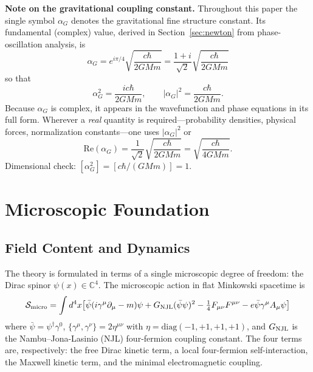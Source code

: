 \documentclass[11pt,a4paper]{article}
\theoremstyle{definition}
\theoremstyle{remark}
\begin{document}
	\bigskip
	\noindent\textbf{Note on the gravitational coupling constant.}
	Throughout this paper the single symbol $\alpha_G$ denotes the gravitational fine structure constant.  Its fundamental (complex) value, derived in Section~\ref{sec:newton} from phase-oscillation analysis, is
	\begin{equation}
		\boxed{\alpha_G = e^{i\pi/4}\sqrt{\frac{c\hbar}{2GMm}} = \frac{1+i}{\sqrt{2}}\sqrt{\frac{c\hbar}{2GMm}}}
		\label{eq:alphaG_def}
	\end{equation}
	so that
	\begin{equation}
		\alpha_G^2 = \frac{ic\hbar}{2GMm}, \qquad |\alpha_G|^2 = \frac{c\hbar}{2GMm}.
		\label{eq:alphaG_props}
	\end{equation}
	Because $\alpha_G$ is complex, it appears in the wavefunction and phase equations in its full form.  Wherever a \emph{real} quantity is required---probability densities, physical forces, normalization constants---one uses $|\alpha_G|^2$ or
	\begin{equation}
		\mathrm{Re}(\alpha_G) = \frac{1}{\sqrt{2}}\sqrt{\frac{c\hbar}{2GMm}} = \sqrt{\frac{c\hbar}{4GMm}}.
		\label{eq:alphaG_real}
	\end{equation}
	Dimensional check: $[\alpha_G^2] = [c\hbar/(GMm)] = 1$.~\checkmark
	
	\section{Microscopic Foundation}
	
	\subsection{Field Content and Dynamics}

	The theory is formulated in terms of a single microscopic degree of freedom: the Dirac spinor $\psi(x)\in\mathbb{C}^4$.  The microscopic action in flat Minkowski spacetime is
	\begin{equation}
	  \mathcal{S}_{\rm micro} = \int d^4x\!\left[
	    \bar{\psi}(i\gamma^\mu\partial_\mu - m)\psi
	    + G_{\rm NJL}(\bar{\psi}\psi)^2
	    - \tfrac{1}{4}F_{\mu\nu}F^{\mu\nu}
	    - e\bar{\psi}\gamma^\mu A_\mu\psi
	  \right]
	  \label{eq:S_micro_correct}
	\end{equation}
	where $\bar{\psi}=\psi^\dagger\gamma^0$, $\{\gamma^\mu,\gamma^\nu\}=2\eta^{\mu\nu}$ with $\eta=\mathrm{diag}(-1,+1,+1,+1)$, and $G_{\rm NJL}$ is the Nambu--Jona-Lasinio (NJL) four-fermion coupling constant.  The four terms are, respectively: the free Dirac kinetic term, a local four-fermion self-interaction, the Maxwell kinetic term, and the minimal electromagnetic coupling.
\end{document}
